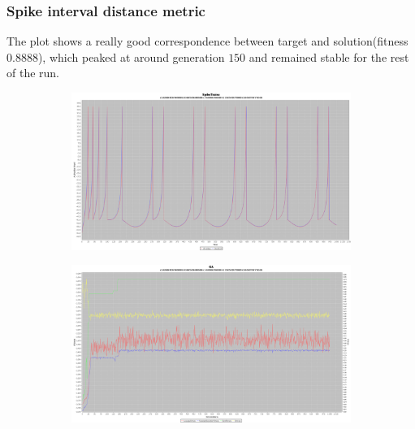 \documentclass[10pt]{article}
\begin{document}
		\subsubsection{Spike interval distance metric}
			The plot shows a really good correspondence between target and solution(fitness $0.8888$), which peaked at around generation $150$ and remained stable for the rest of the run.
			\begin{figure}[H]
				\centering
					\begin{subfigure}{.5\textwidth}
						\centering
						\includegraphics[width=\linewidth]{./../images/izzy2/interval/plot.png}
						
						\label{fig:sub5a}
					\end{subfigure}%
					\begin{subfigure}{.5\textwidth}
						\centering
						\includegraphics[width=\linewidth]{./../images/izzy2/interval/prog.png}
						
						\label{fig:sub5b}
					\end{subfigure}
					
					\label{fig:plot5}
			\end{figure}
			
\end{document}

